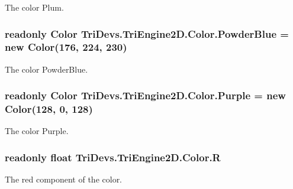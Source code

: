 The color Plum. 

\hypertarget{struct_tri_devs_1_1_tri_engine2_d_1_1_color_a68c74837201d0f1792ea4cb13ad57f6b}{
\subsubsection[{Powder\-Blue}]{\setlength{\rightskip}{0pt plus 5cm}readonly {\bf Color} Tri\-Devs.\-Tri\-Engine2\-D.\-Color.\-Powder\-Blue = new {\bf Color}(176, 224, 230)\hspace{0.3cm}{\ttfamily [static]}}}\label{struct_tri_devs_1_1_tri_engine2_d_1_1_color_a68c74837201d0f1792ea4cb13ad57f6b}


The color Powder\-Blue. 

\hypertarget{struct_tri_devs_1_1_tri_engine2_d_1_1_color_aa6ad084d5ee3b55cf167d0558e514784}{
\subsubsection[{Purple}]{\setlength{\rightskip}{0pt plus 5cm}readonly {\bf Color} Tri\-Devs.\-Tri\-Engine2\-D.\-Color.\-Purple = new {\bf Color}(128, 0, 128)\hspace{0.3cm}{\ttfamily [static]}}}\label{struct_tri_devs_1_1_tri_engine2_d_1_1_color_aa6ad084d5ee3b55cf167d0558e514784}


The color Purple. 

\hypertarget{struct_tri_devs_1_1_tri_engine2_d_1_1_color_a1e20afa7351aa10c5ab4bfafcaeca021}{
\subsubsection[{R}]{\setlength{\rightskip}{0pt plus 5cm}readonly float Tri\-Devs.\-Tri\-Engine2\-D.\-Color.\-R}}\label{struct_tri_devs_1_1_tri_engine2_d_1_1_color_a1e20afa7351aa10c5ab4bfafcaeca021}


The red component of the color. 

